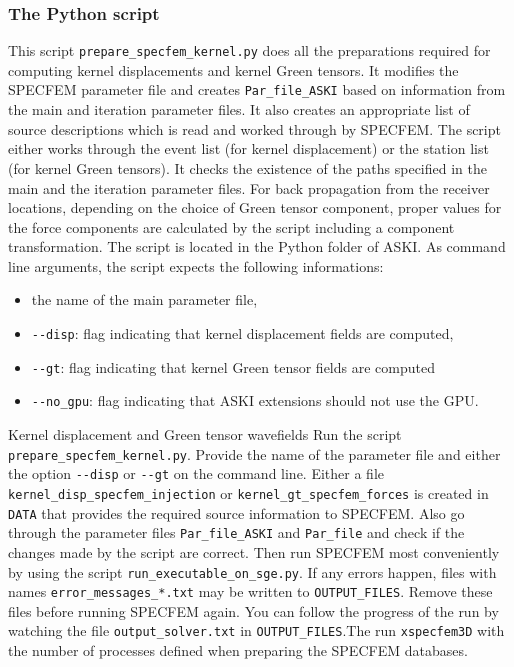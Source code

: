 \subsubsection{The Python script}
%
This script \verb+prepare_specfem_kernel.py+ does all the preparations required for computing kernel displacements and kernel Green tensors. It modifies the SPECFEM parameter file and creates \verb+Par_file_ASKI+ based on information from the main and iteration parameter files. It also creates an appropriate list of source descriptions which is read and worked through by SPECFEM. The script either works through the event list (for kernel displacement) or the station list (for kernel Green tensors). It checks the existence of the paths specified in the main and the iteration parameter files. For back propagation from the receiver locations, depending on the choice of Green tensor component, proper values for the force components are calculated by the script including a component transformation. The script is located in the Python folder of ASKI. As command line arguments, the script expects the following informations:
%
\begin{itemize}
	\setlength{\itemsep}{-0.1cm}
   \item the name of the main parameter file,
   \item \verb+--disp+: flag indicating that kernel displacement fields are computed,
   \item \verb+--gt+: flag indicating that kernel Green tensor fields are computed
   \item \verb+--no_gpu+: flag indicating that ASKI extensions should not use the GPU.
\end{itemize}
%
 \begin{actionbox}[label={action:run-kernel},float=h!]{Kernel displacement and Green tensor wavefields }
   Run the script \verb+prepare_specfem_kernel.py+. Provide the name of the parameter file and either the option \verb+--disp+ or \verb+--gt+ on the command line. Either a file \verb+kernel_disp_specfem_injection+ or \verb+kernel_gt_specfem_forces+ is created in \verb+DATA+ that provides the required source information to SPECFEM. Also go through the parameter files \verb+Par_file_ASKI+ and \verb+Par_file+ and check if the changes made by the script are correct. Then run SPECFEM most conveniently by using the script \verb+run_executable_on_sge.py+. If any errors happen, files with names \verb+error_messages_*.txt+ may be written to \verb+OUTPUT_FILES+. Remove these files before running SPECFEM again. You can follow the progress of the run by watching the file \verb+output_solver.txt+ in \verb+OUTPUT_FILES+.The run \verb+xspecfem3D+ with the number of processes defined when preparing the SPECFEM databases.
 \end{actionbox}

